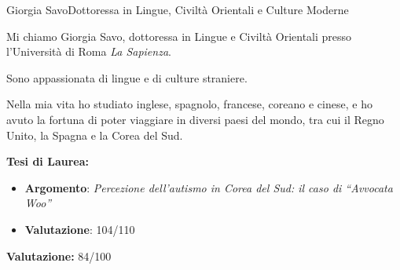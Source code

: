 \documentclass{article}
\begin{document}
\begin{cv}[avatar]{Giorgia Savo}{Dottoressa in Lingue, Civiltà Orientali e Culture Moderne}


\small
Mi chiamo Giorgia Savo, dottoressa in Lingue e Civiltà Orientali presso l'Università di Roma \textit{La Sapienza}.

Sono appassionata di lingue e di culture straniere.

Nella mia vita ho studiato inglese, spagnolo, francese, coreano e cinese,
e ho avuto la fortuna di poter viaggiare in diversi paesi del mondo, tra cui il Regno Unito, la Spagna e la Corea del Sud.
\normalsize
%


\begin{cvevent}[Settembre 2019][Settembre 2023]
    \textbf{Tesi di Laurea:}
    \begin{itemize}
        \item \textbf{Argomento}: \textit{Percezione dell’autismo in Corea del Sud: il caso di “Avvocata Woo”}
        \item \textbf{Valutazione}: 104/110
    \end{itemize}
\end{cvevent}

\begin{cvevent}[Settembre 2014][Luglio 2019]
	\textbf{Valutazione:} 84/100
\end{cvevent}


\end{cv}
\end{document}
